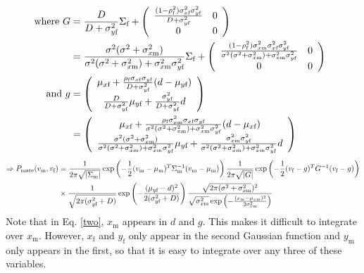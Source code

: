 \documentclass{article}
\newcommand{\x}[1]{\text{#1}}
\begin{document}
\begin{pf}
\begin{align}
\notag\\ \text{ where } G &= \frac{D}{D+\sigma_{y\x{f}}^2}\Sigma_\x{f}+\left(\begin{array}{cc} \frac{(1-\rho_\x{f}^2)\sigma_{x\x{f}}^2\sigma_{y\x{f}}^2}{D+\sigma_{y\x{f}}^2} & 0  \\ 0 & 0 \end{array}\right)  
\notag \\&= \frac{\sigma^2(\sigma^2+\sigma_{x\x{m}}^2)}{\sigma^2(\sigma^2+\sigma_{x\x{m}}^2)+\sigma_{x\x{m}}^2\sigma_{y\x{f}}^2}\Sigma_\x{f}+\left(\begin{array}{cc} \frac{(1-\rho_\x{f}^2)\sigma_{x\x{m}}^2\sigma_{x\x{f}}^2\sigma_{y\x{f}}^2}{\sigma^2(\sigma^2+\sigma_{x\x{m}}^2)+\sigma_{x\x{m}}^2\sigma_{y\x{f}}^2} & 0  \\ 0 & 0 \end{array}\right) \label{G}
\\ \text{ and } g & = \left(\begin{array}{cc}\mu_{x\x{f}}+\frac{\rho_\x{f}\sigma_{x\x{f}}\sigma_{y\x{f}}}{D+\sigma_{y\x{f}}^2}(d-\mu_{y\x{f}})
\notag\\ \frac{D}{D+\sigma_{y\x{f}}^2}\mu_{y\x{f}}+\frac{\sigma_{y\x{f}}^2}{D+\sigma_{y\x{f}}^2}d \end{array} \right) 
\notag
\\&=\left(\begin{array}{cc}\mu_{x\x{f}}+\frac{\rho_\x{f}\sigma_{x\x{m}}^2\sigma_{x\x{f}}\sigma_{y\x{f}}}{\sigma^2(\sigma^2+\sigma_{x\x{m}}^2)+\sigma_{x\x{m}}^2\sigma_{y\x{f}}^2}(d-\mu_{x\x{f}})
\notag
\\ \frac{\sigma^2(\sigma^2+\sigma_{x\x{m}}^2)}{\sigma^2(\sigma^2+\sigma_{x\x{m}}^2)+\sigma_{x\x{m}}^2\sigma_{y\x{f}}^2}\mu_{y\x{f}}+\frac{\sigma_{x\x{m}}^2\sigma_{y\x{f}}^2}{\sigma^2(\sigma^2+\sigma_{x\x{m}}^2)+\sigma_{x\x{m}}^2\sigma_{y\x{f}}^2}d \end{array} \right) \notag
\end{align}
\begin{align} 
\Rightarrow P_\x{mate}(v_\x{m},v_\x{f})&=\frac{1}{2\pi\sqrt{|\Sigma_\x{m}|}}\exp\left(-\frac{1}{2}(v_\x{m}-\mu_\x{m})^T\Sigma_\x{m}^{-1}(v_\x{m}-\mu_\x{m})\right)\frac{1}{2\pi\sqrt{|G|}}\exp\left(-\frac{1}{2}(v_\x{f}-g)^TG^{-1}(v_\x{f}-g)\right) \notag
\\&\times \frac{1}{\sqrt{2\pi(\sigma_{y\x{f}}^2+D)}}\exp\left(-\frac{(\mu_{y\x{f}}-d)^2}{2(\sigma_{y\x{f}}^2+D)}\right)\frac{\sqrt{2\pi(\sigma^2+\sigma_{x\x{m}}^2})^2}{\sqrt{\sigma_{x\x{m}}^2}\exp\left(-\frac{(x_\x{m}-\mu_{x\x{m}})^2}{2\sigma_{x\x{m}}^2}\right)}\label{two}
\end{align}
Note that in Eq. \ref{two}, $x_\x{m}$ appears in $d$ and $g$. This makes it difficult to integrate over $x_\x{m}$. However, $x_\x{f}$ and $y_\x{f}$ only appear in the second Gaussian function and $y_\x{m}$ only appears in the first, so that it is easy to integrate over any three of these variables.


\end{pf}
\end{document}
